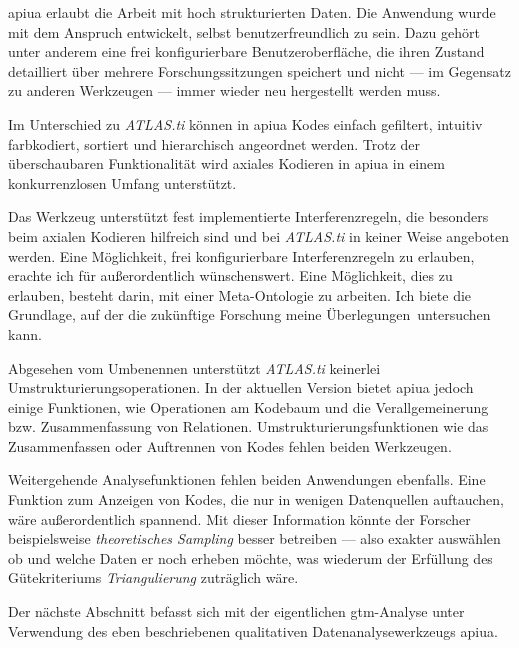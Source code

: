 \gls{apiua} erlaubt die Arbeit mit hoch strukturierten Daten. Die Anwendung wurde mit dem Anspruch entwickelt, selbst benutzerfreundlich zu sein. Dazu gehört unter anderem eine frei konfigurierbare Benutzeroberfläche, die ihren Zustand detailliert über mehrere Forschungssitzungen speichert und nicht --- im Gegensatz zu anderen Werkzeugen --- immer wieder neu hergestellt werden muss.

Im Unterschied zu \textit{ATLAS.ti} können in \gls{apiua} Kodes einfach gefiltert, intuitiv farbkodiert, sortiert und hierarchisch angeordnet werden. Trotz der überschaubaren Funktionalität wird axiales Kodieren in \gls{apiua} in einem konkurrenzlosen Umfang unterstützt.

Das Werkzeug unterstützt fest implementierte Interferenzregeln, die besonders beim axialen Kodieren hilfreich sind und bei \textit{ATLAS.ti} in keiner Weise angeboten werden. Eine Möglichkeit, frei konfigurierbare Interferenzregeln zu erlauben, erachte ich für außerordentlich wünschenswert. Eine Möglichkeit, dies zu erlauben, besteht darin, mit einer Meta-Ontologie zu arbeiten. Ich biete die Grundlage, auf der die zukünftige Forschung meine Überlegungen untersuchen kann.

Abgesehen vom Umbenennen unterstützt \textit{ATLAS.ti} keinerlei Umstrukturierungsoperationen. In der aktuellen Version bietet \gls{apiua} jedoch einige Funktionen, wie Operationen am Kodebaum und die Verallgemeinerung bzw. Zusammenfassung von Relationen. Umstrukturierungsfunktionen wie das Zusammenfassen oder Auftrennen von Kodes fehlen beiden Werkzeugen.

Weitergehende Analysefunktionen fehlen beiden Anwendungen ebenfalls. Eine Funktion zum Anzeigen von Kodes, die nur in wenigen Datenquellen auftauchen, wäre außerordentlich spannend. Mit dieser Information könnte der Forscher beispielsweise \textit{theoretisches Sampling} besser betreiben --- also exakter auswählen ob und welche Daten er noch erheben möchte, was wiederum der Erfüllung des Gütekriteriums \textit{Triangulierung} zuträglich wäre.


\bigskip

Der nächste Abschnitt befasst sich mit der eigentlichen \gls{gtm}-Analyse unter Verwendung des eben beschriebenen qualitativen Datenanalysewerkzeugs \acrlong{apiua}.